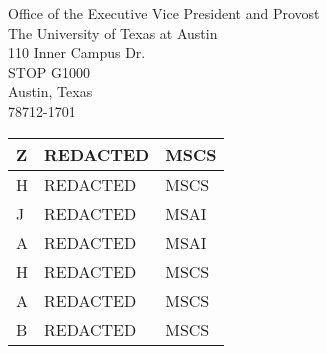 \documentclass[11pt]{letter}
\begin{document}
\begin{letter}{Office of the Executive Vice President and Provost \\ The University of Texas at Austin \\ 110 Inner Campus Dr. \\ STOP G1000 \\ Austin, Texas \\ 78712-1701}
\begin{tabular}{|p{5cm}|p{6.7cm}|p{2.25cm}|}
        Z & REDACTED & MSCS \\ \hline
        H & REDACTED & MSCS \\ \hline
        J & REDACTED & MSAI \\ \hline
        A & REDACTED & MSAI \\ \hline
        H & REDACTED & MSCS \\ \hline
        A & REDACTED & MSCS \\ \hline
        B & REDACTED & MSCS \\ \hline
    \end{tabular}

\end{letter}
\end{document}
